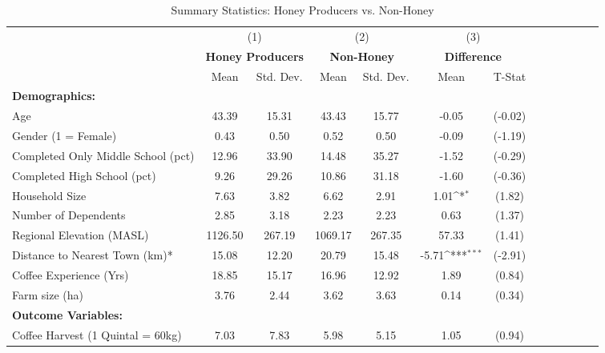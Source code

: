 \begin{table}[htbp]\centering \small
\def\sym#1{\ifmmode^{#1}\else\(^{#1}\)\fi}
\caption{Summary Statistics: Honey Producers vs. Non-Honey \label{table_summary_honey}}
\begin{tabular}{l*{3}{cccc}}
\toprule
                &\multicolumn{2}{c}{(1)}&\multicolumn{2}{c}{(2)}&\multicolumn{2}{c}{(3)}     \\
                &\multicolumn{2}{c}{\textbf{Honey Producers}}&\multicolumn{2}{c}{\textbf{  Non-Honey  }}&\multicolumn{2}{c}{\textbf{Difference}}\\
                &     Mean&Std. Dev.&     Mean&Std. Dev.&     Mean         &   T-Stat\\
\midrule
\textbf{Demographics:}&         &         &         &         &                  &         \\
\addlinespace
Age             &    43.39&    15.31&    43.43&    15.77&    -0.05         &  (-0.02)\\
\addlinespace
Gender (1 = Female)&     0.43&     0.50&     0.52&     0.50&    -0.09         &  (-1.19)\\
\addlinespace
Completed Only Middle School (pct)&    12.96&    33.90&    14.48&    35.27&    -1.52         &  (-0.29)\\
\addlinespace
Completed High School (pct)&     9.26&    29.26&    10.86&    31.18&    -1.60         &  (-0.36)\\
\addlinespace
Household Size  &     7.63&     3.82&     6.62&     2.91&     1.01\sym{*}  &   (1.82)\\
\addlinespace
Number of Dependents&     2.85&     3.18&     2.23&     2.23&     0.63         &   (1.37)\\
\addlinespace
Regional Elevation (MASL)&  1126.50&   267.19&  1069.17&   267.35&    57.33         &   (1.41)\\
\addlinespace
Distance to Nearest Town (km)*&    15.08&    12.20&    20.79&    15.48&    -5.71\sym{***}&  (-2.91)\\
\addlinespace
Coffee Experience (Yrs)&    18.85&    15.17&    16.96&    12.92&     1.89         &   (0.84)\\
\addlinespace
Farm size (ha)  &     3.76&     2.44&     3.62&     3.63&     0.14         &   (0.34)\\
\addlinespace
\textbf{Outcome Variables:}&         &         &         &         &                  &         \\
\addlinespace
Coffee Harvest (1 Quintal = 60kg)&     7.03&     7.83&     5.98&     5.15&     1.05         &   (0.94)\\

\end{tabular}
\end{table}

